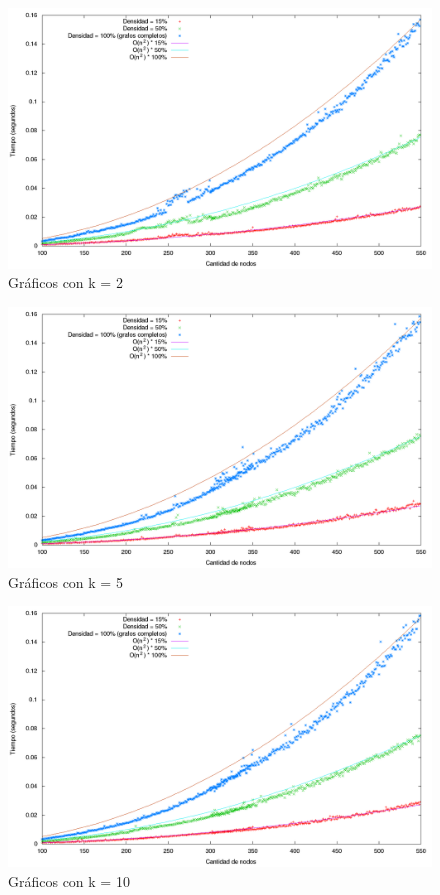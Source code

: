 \begin{figure}[H]
\begin{center}
\includegraphics[scale=0.4]{./img/greedyN1.png}
\caption{Gráficos con k = 2}
\end{center}
\end{figure}

\begin{figure}[H]
\begin{center}
\includegraphics[scale=0.4]{./img/greedyN2.png}
\caption{Gráficos con k = 5}
\end{center}
\end{figure}

\begin{figure}[H]
\begin{center}
\includegraphics[scale=0.4]{./img/greedyN3.png}
\caption{Gráficos con k = 10}
\end{center}
\end{figure}


